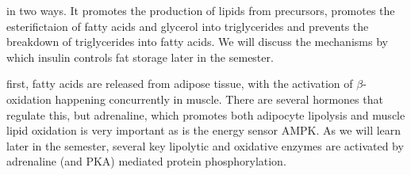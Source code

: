 \documentclass{tufte-handout}
\begin{document}
 in two ways.  It promotes the production of lipids from precursors, promotes the esterifictaion of fatty acids and glycerol into triglycerides and prevents the breakdown of triglycerides into fatty acids.  We will discuss the mechanisms by which insulin controls fat storage later in the semester.

 first, fatty acids are released from adipose tissue, with the activation of $\beta$-oxidation happening concurrently in muscle.  There are several hormones that regulate this, but adrenaline, which promotes both adipocyte lipolysis and muscle lipid oxidation is very important as is the energy sensor AMPK.  As we will learn later in the semester, several key lipolytic and oxidative enzymes are activated by adrenaline (and PKA) mediated protein phosphorylation.



\end{document}

